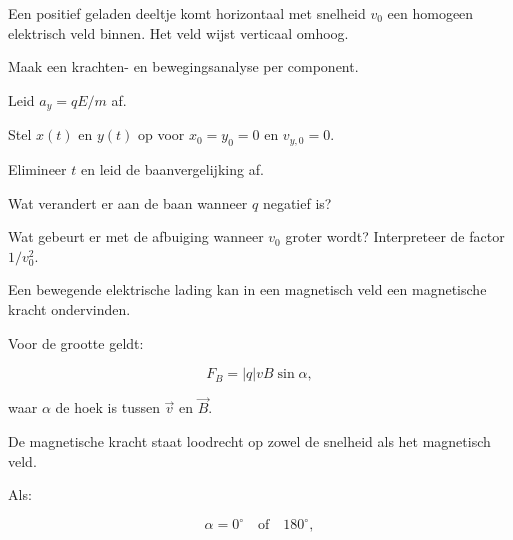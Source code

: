 \documentclass{ximera}
\begin{document}
\begin{oefening}{\oefU}

Een positief geladen deeltje komt horizontaal met snelheid $v_0$ een
homogeen elektrisch veld binnen. Het veld wijst verticaal omhoog.

\begin{question}
Maak een krachten- en bewegingsanalyse per component.
\end{question}

\begin{question}
Leid $a_y=qE/m$ af.
\end{question}

\begin{question}
Stel $x(t)$ en $y(t)$ op voor $x_0=y_0=0$ en $v_{y,0}=0$.
\end{question}

\begin{question}
Elimineer $t$ en leid de baanvergelijking af.
\end{question}

\begin{question}
Wat verandert er aan de baan wanneer $q$ negatief is?
\end{question}

\begin{question}
Wat gebeurt er met de afbuiging wanneer $v_0$ groter wordt?
Interpreteer de factor $1/v_0^2$.
\end{question}

\end{oefening}




Een bewegende elektrische lading kan in een magnetisch veld een
magnetische kracht ondervinden.

Voor de grootte geldt:

\[
\boxed{
F_B=|q|vB\sin\alpha,
}
\]

waar $\alpha$ de hoek is tussen $\vec v$ en $\vec B$.

De magnetische kracht staat loodrecht op zowel de snelheid als het
magnetisch veld.



Als:

\[
\alpha=0^\circ
\quad\text{of}\quad
180^\circ,
\]
\end{document}
